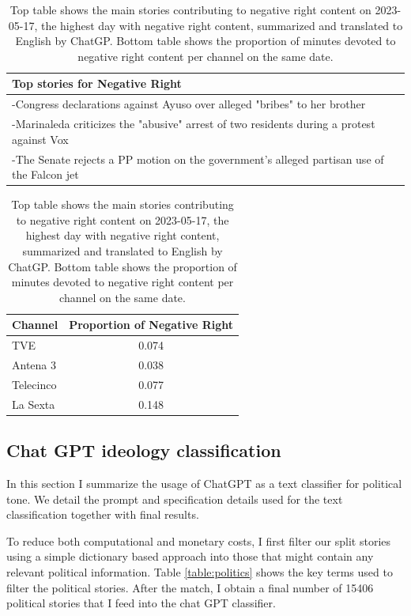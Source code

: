 \documentclass[12pt]{article}
\begin{document}
	
		\begin{table}[h]
		\centering
		\begin{tabular}{p{}}
			\toprule
			\textbf{Top stories for  Negative Right}  \\
			\midrule
			-Congress declarations against Ayuso over alleged "bribes" to her brother  \\
			-Marinaleda criticizes the "abusive" arrest of two residents during a protest against Vox  \\
			-The Senate rejects a PP motion on the government's alleged partisan use of the Falcon jet  \\
			\bottomrule
		\end{tabular}
	
		

		\begin{tabular}{l c}
			\toprule
			\textbf{Channel} & \textbf{Proportion of Negative Right} \\
			\midrule
			TVE & 0.074 \\
			Antena 3  & 0.038 \\
			Telecinco  & 0.077 \\
			La Sexta  & 0.148 \\
			\bottomrule
		\end{tabular}
		\caption{Top table shows the main stories contributing to negative right content on 2023-05-17, the highest day with negative right content,  summarized and translated to English by ChatGP. Bottom table shows the proportion of minutes devoted to negative right content per channel on the same date. }
		\label{tab:neg_right_channels}
	\end{table}
	
	
	
	
	\subsection{Chat GPT ideology classification}\label{sec:chat_gpt}
	
	In this section I summarize the usage of ChatGPT as a text classifier for political tone. We detail the prompt and specification details used for the text classification together with final results. 
	
	
	
	
	To reduce both computational and monetary costs, I first filter our split stories using a simple dictionary based approach into those that might contain any relevant political information. Table \ref{table:politics} shows the key terms used to filter the political stories. After the match, I obtain a final number of 15406 political stories that I feed into the chat GPT classifier.
	
\end{document}
